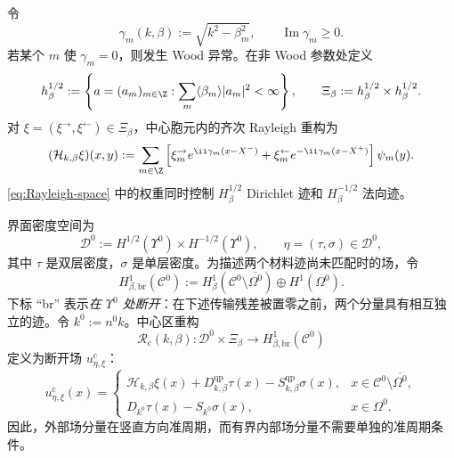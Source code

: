 令
\[
  \gamma_m(k,\beta):=\sqrt{k^2-\beta_m^2},
  \qquad \operatorname{Im}\gamma_m\geq0.
\]
若某个 $m$ 使 $\gamma_m=0$，则发生 Wood 异常。在非 Wood 参数处定义
\begin{equation}
  h^{1/2}_\beta:=
  \left\{a=(a_m)_{m\in\Z}:
  \sum_m\langle\beta_m\rangle|a_m|^2<\infty\right\},
  \qquad
  \Xi_\beta:=h^{1/2}_\beta\times h^{1/2}_\beta.
  \label{eq:Rayleigh-space}
\end{equation}
对 $\xi=(\xi^\rightarrow,\xi^\leftarrow)\in\Xi_\beta$，中心胞元内的齐次 Rayleigh 重构为
\begin{equation}
  (\mathcal H_{k,\beta}\xi)(x,y)
  :=\sum_{m\in\Z}\left[
  \xi_m^\rightarrow e^{\ii\gamma_m(x-X^-)}
  +\xi_m^\leftarrow e^{-\ii\gamma_m(x-X^+)}\right]\psi_m(y).
  \label{eq:Rayleigh-reconstruction}
\end{equation}
\eqref{eq:Rayleigh-space} 中的权重同时控制 $H^{1/2}_\beta$ Dirichlet 迹和 $H^{-1/2}_\beta$ 法向迹。

界面密度空间为
\begin{equation}
  \mathcal D^0:=H^{1/2}(\Upsilon^0)\times H^{-1/2}(\Upsilon^0),
  \qquad \eta=(\tau,\sigma)\in\mathcal D^0,
  \label{eq:density-space}
\end{equation}
其中 $\tau$ 是双层密度，$\sigma$ 是单层密度。为描述两个材料迹尚未匹配时的场，令
\begin{equation}
  H^1_{\beta,\mathrm{br}}(\mathcal C^0):=
  H^1_\beta(\mathcal C^0\setminus\overline{\Omega^0})
  \oplus H^1(\Omega^0).
  \label{eq:center-broken-space}
\end{equation}
下标 ``br'' 表示\emph{在 $\Upsilon^0$ 处断开}：在下述传输残差被置零之前，两个分量具有相互独立的迹。令 $k^0:=n^0k$。中心区重构
\begin{equation}
  \mathcal R_{\mathrm c}(k,\beta):\mathcal D^0\times\Xi_\beta
  \longrightarrow H^1_{\beta,\mathrm{br}}(\mathcal C^0)
  \label{eq:center-reconstruction-map}
\end{equation}
定义为断开场 $u_{\eta,\xi}^{\mathrm c}$：
\begin{equation}
  u_{\eta,\xi}^{\mathrm c}(x)=
  \begin{cases}
  \mathcal H_{k,\beta}\xi(x)
  +D^{\mathrm{qp}}_{k,\beta}\tau(x)
  -S^{\mathrm{qp}}_{k,\beta}\sigma(x),
  &x\in\mathcal C^0\setminus\overline{\Omega^0},\\
  D_{k^0}\tau(x)-S_{k^0}\sigma(x),
  &x\in\Omega^0.
  \end{cases}
  \label{eq:center-reconstruction}
\end{equation}
因此，外部场分量在竖直方向准周期，而有界内部场分量不需要单独的准周期条件。

